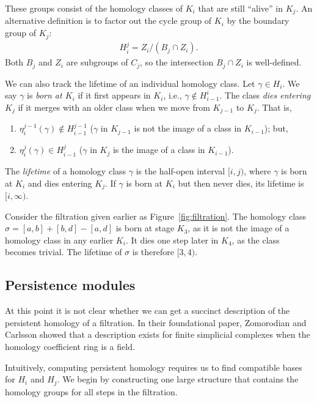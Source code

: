 These groups consist of the homology classes of $K_i$ that are still ``alive'' in $K_j$. An alternative definition is to factor out the cycle group of $K_i$ by the boundary group of $K_j$:
\begin{align*}
H_i^j = Z_i / (B_j \cap Z_i).
\end{align*}
Both $B_j$ and $Z_i$ are subgroups of $C_j$, so the intersection $B_j \cap Z_i$ is well-defined.

We can also track the lifetime of an individual homology class. Let $\gamma \in H_i$. We say $\gamma$ is \emph{born at $K_i$} if it first appears in $K_i$, i.e., $\gamma \notin H_{i-1}^i$. The class \emph{dies entering $K_j$} if it merges with an older class when we move from $K_{j-1}$ to $K_j$. That is,
\begin{enumerate}
\item $\eta_i^{j-1}(\gamma) \notin H_{i-1}^{j-1}$ ($\gamma$ in $K_{j-1}$ is not the image of a class in $K_{i-1}$); but,
\item $\eta_i^j(\gamma) \in H_{i-1}^j$ ($\gamma$ in $K_{j}$ is the image of a class in $K_{i-1}$).
\end{enumerate}

The \emph{lifetime} of a homology class $\gamma$ is the half-open interval $[i, j)$, where $\gamma$ is born at $K_i$ and dies entering $K_j$. If $\gamma$ is born at $K_i$ but then never dies, its lifetime is $[i, \infty)$.

\begin{example}
Consider the filtration given earlier as Figure~\ref{fig:filtration}. The homology class $\sigma = [a, b] + [b, d] - [a, d]$ is born at stage $K_3$, as it is not the image of a homology class in any earlier $K_i$. It dies one step later in $K_4$, as the class becomes trivial. The lifetime of $\sigma$ is therefore $[3, 4)$.
\end{example}

\subsection{Persistence modules}

At this point it is not clear whether we can get a succinct description of the persistent homology of a filtration. In their foundational paper, Zomorodian and Carlsson \cite{zomorodian2005computing} showed that a description exists for finite simplicial complexes when the homology coefficient ring is a field.

Intuitively, computing persistent homology requires us to find compatible bases for $H_i$ and $H_j$. We begin by constructing one large structure that contains the homology groups for all steps in the filtration.

